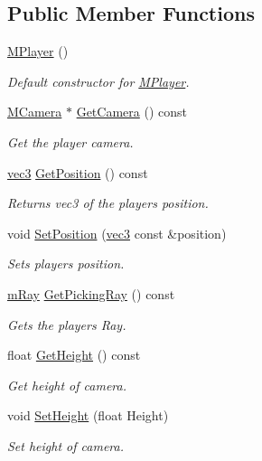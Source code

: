 \subsection*{Public Member Functions}
\begin{DoxyCompactItemize}
\item 
\hyperlink{class_m_player_a505e4bd268a9b786b2913a887c9c5173}{M\+Player} ()
\begin{DoxyCompactList}\small\item\em Default constructor for \hyperlink{class_m_player}{M\+Player}. \end{DoxyCompactList}\item 
\hyperlink{class_m_camera}{M\+Camera} $\ast$ \hyperlink{class_m_player_a11f65e2d58adc6d3a902f775b143f0cb}{Get\+Camera} () const 
\begin{DoxyCompactList}\small\item\em Get the player camera. \end{DoxyCompactList}\item 
\hyperlink{_types_8h_a3d0ce73e3199de81565fb01632415288}{vec3} \hyperlink{class_m_player_af7147ad6637bd1477b236d82a53dac61}{Get\+Position} () const 
\begin{DoxyCompactList}\small\item\em Returns vec3 of the player\textquotesingle{}s position. \end{DoxyCompactList}\item 
void \hyperlink{class_m_player_a11028edd9b2019c897bdcb51a05b6971}{Set\+Position} (\hyperlink{_types_8h_a3d0ce73e3199de81565fb01632415288}{vec3} const \&position)
\begin{DoxyCompactList}\small\item\em Sets player\textquotesingle{}s position. \end{DoxyCompactList}\item 
\hyperlink{structm_ray}{m\+Ray} \hyperlink{class_m_player_af357bfec947db56384c5b1dcc989faab}{Get\+Picking\+Ray} () const 
\begin{DoxyCompactList}\small\item\em Get\textquotesingle{}s the player\textquotesingle{}s Ray. \end{DoxyCompactList}\item 
float \hyperlink{class_m_player_a9936492d6493d890ef9b84bbbce55df9}{Get\+Height} () const 
\begin{DoxyCompactList}\small\item\em Get height of camera. \end{DoxyCompactList}\item 
void \hyperlink{class_m_player_afaee4f00283e72cf3a7ac9d67440f499}{Set\+Height} (float Height)
\begin{DoxyCompactList}\small\item\em Set height of camera. \end{DoxyCompactList}\end{DoxyCompactItemize}
